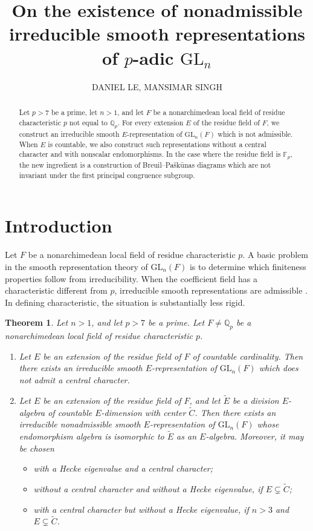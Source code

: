 \documentclass[a4paper,10pt,twoside]{amsart}
\title[Nonadmissible irreducible representations]{On the existence of nonadmissible irreducible smooth representations of $p$-adic \(\mathrm{GL}_n\)}
\author{DANIEL LE, MANSIMAR SINGH}
\date{}
\newtheorem{theorem}{Theorem}[section]
\theoremstyle{definition}
\numberwithin{equation}{section}
\begin{document}
\begin{abstract}
Let \(p>7\) be a prime, let \(n>1\), and let \(F\) be a nonarchimedean local field of residue characteristic \(p\) not equal to $\mathbb Q_p$. For every extension \(E\) of the residue field of \(F\), we construct an irreducible smooth \(E\)-representation of \(\mathrm{GL}_n(F)\) which is not admissible. When $E$ is countable, we also construct such representations without a central character and with nonscalar endomorphisms. In the case where the residue field is \(\mathbb F_p\), the new ingredient is a construction of Breuil--Pa\v{s}k\={u}nas diagrams which are not invariant under the first principal congruence subgroup.
\end{abstract}

\maketitle

\section{Introduction}

Let \(F\) be a nonarchimedean local field of residue characteristic \(p\). A basic problem in the smooth representation theory of \(\mathrm{GL}_n(F)\) is to determine which finiteness properties follow from irreducibility. When the coefficient field has a characteristic different from \(p\), irreducible smooth representations are admissible \cite{Vig96}. In defining characteristic, the situation is substantially less rigid.

\begin{theorem}\label{thm:main}
Let \(n>1\), and let \(p>7\) be a prime. Let \(F\neq\mathbb Q_p\) be a nonarchimedean local field of residue characteristic \(p\).

\begin{enumerate}
\item Let \(E\) be an extension of the residue field of \(F\) of countable cardinality. Then there exists an irreducible smooth \(E\)-representation of \(\mathrm{GL}_n(F)\) which does not admit a central character.

\item Let \(E\) be an extension of the residue field of \(F\), and let
\(\widetilde E\) be a division \(E\)-algebra of countable \(E\)-dimension
with center \(\widetilde C\). Then there exists an irreducible
nonadmissible smooth \(E\)-representation of \(\mathrm{GL}_n(F)\) whose
endomorphism algebra is isomorphic to \(\widetilde E\) as an \(E\)-algebra.
Moreover, it may be chosen
\begin{itemize}
\item with a Hecke eigenvalue and a central character;
\item without a central character and without a Hecke eigenvalue, if
\(E\subsetneq\widetilde C\);
\item with a central character but without a Hecke eigenvalue, if
\(n>3\) and \(E\subsetneq\widetilde C\).
\end{itemize}
\end{enumerate}
\end{theorem}
\end{document}
